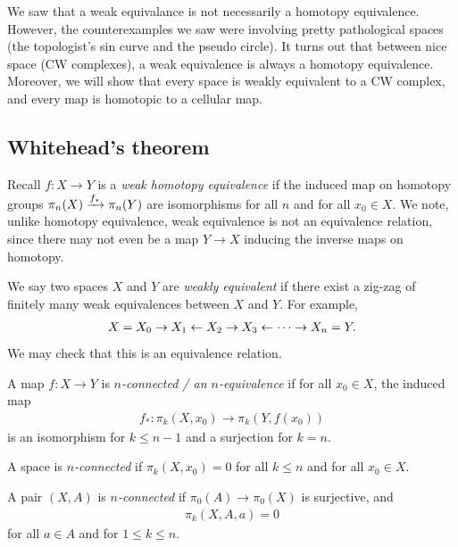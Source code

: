 \documentclass{article}[11pt]
\begin{document}
We saw that a weak equivalance is not necessarily a homotopy equivalence. However, the counterexamples we saw were involving pretty pathological spaces (the topologist's sin curve and the pseudo circle). It turns out that between nice space (CW complexes), a weak equivalence is always a homotopy equivalence. Moreover, we will show that every space is weakly equivalent to a CW complex, and every map is homotopic to a cellular map. 

\subsection{Whitehead's theorem}
Recall $f:X \to Y$ is a \textit{weak homotopy equivalence} if the induced map on homotopy groups $\pi_n(X) \xrightarrow{f_\ast} \pi_n(Y)$ are isomorphisms for all $n$ and for all $x_0 \in X$. We note, unlike homotopy equivalence, weak equivalence is not an equivalence relation, since there may not even be a map $Y\to X$ inducing the inverse maps on homotopy.

\begin{definition} We say two spaces $X$ and $Y$ are \textit{weakly equivalent} if there exist a zig-zag of finitely many weak equivalences between $X$ and $Y$. For example,
\begin{align*}
	X = X_0 \to X_1 \leftarrow X_2 \to X_3 \leftarrow \cdots \to X_n = Y.
\end{align*}
We may check that this is an equivalence relation.
\end{definition}

\begin{definition} A map $f: X\to Y$ is \textit{$n$-connected / an $n$-equivalence} if for all $x_0 \in X$, the induced map
\begin{align*}
	f_\ast : \pi_k(X,x_0) \to \pi_k(Y,f(x_0))
\end{align*}
is an isomorphism for $k\leq n-1$ and a surjection for $k=n$.
\end{definition}

\begin{definition} A space is \textit{$n$-connected} if $\pi_k(X,x_0) = 0$ for all $k\leq n$ and for all $x_0 \in X$.
\end{definition}

\begin{definition} A pair $(X,A)$ is \textit{$n$-connected} if $\pi_0(A)\to\pi_0(X)$ is surjective, and
\begin{align*}
	\pi_k(X,A,a) = 0
\end{align*}
for all $a\in A$ and for $1\leq k\leq n$.
\end{definition}
\end{document}

